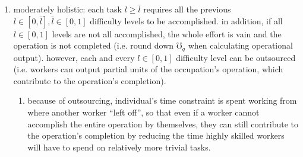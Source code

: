 \documentclass[hidelinks, nonatbib]{elsarticle}
\begin{document}
\begin{enumerate}
\begin{enumerate}
\begin{enumerate}
        \end{enumerate} 
        \item moderately holistic: each task $l \geq \bar{l}$ requires all the previous $l \in [0, \bar{l}], \bar{l} \in [0,1]$ difficulty levels to be accomplished. in addition, if all $l \in [0,1]$ levels are not all accomplished, the whole effort is vain and the operation is not completed (i.e. round down $\mho_q$ when calculating operational output). however, each and every $l \in [0,1]$ difficulty level can be outsourced (i.e. workers can output partial units of the occupation's operation, which contribute to the operation's completion).
        \begin{enumerate}
            \item because of outsourcing, individual's time constraint is spent working from where another worker ``left off'', so that even if a worker cannot accomplish the entire operation by themselves, they can still contribute to the operation's completion by reducing the time highly skilled workers will have to spend on relatively more trivial tasks.
            

\end{enumerate}
\end{enumerate}
\end{enumerate}
\end{document}
